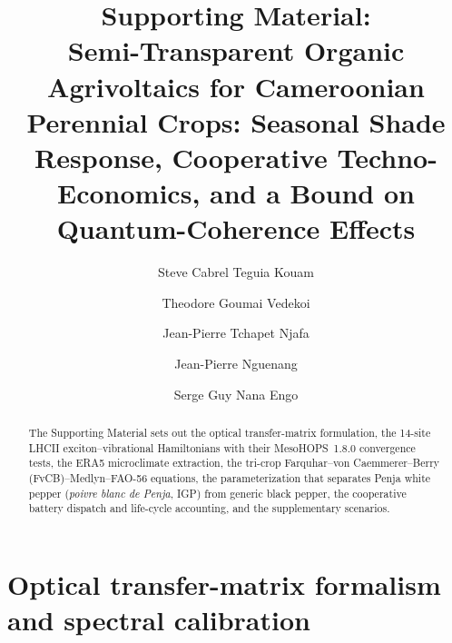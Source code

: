 \documentclass[preprint,12pt,a4paper]{elsarticle}
\begin{document}
\begin{frontmatter}
\title{Supporting Material:\\Semi-Transparent Organic Agrivoltaics for Cameroonian Perennial Crops: Seasonal Shade Response, Cooperative Techno-Economics, and a Bound on Quantum-Coherence Effects}

\author[udla]{Steve Cabrel Teguia Kouam}
\author[uy1]{Theodore Goumai Vedekoi}
\author[uy1]{Jean-Pierre Tchapet Njafa}
\author[udla]{Jean-Pierre Nguenang}
\author[uy1]{Serge Guy Nana Engo}

\address[udla]{Department of Physics, Faculty of Science, University of Douala, P.O. Box 24157, Douala, Cameroon}
\address[uy1]{Department of Physics, Faculty of Science, University of Yaound\'e~I, P.O. Box 812, Yaound\'e, Cameroon}

\begin{abstract}
The Supporting Material sets out the optical transfer-matrix formulation, the 14-site LHCII exciton--vibrational Hamiltonians with their MesoHOPS~1.8.0 convergence tests, the ERA5 microclimate extraction, the tri-crop Farquhar--von Caemmerer--Berry (FvCB)--Medlyn--FAO-56 equations, the parameterization that separates Penja white pepper (\textit{poivre blanc de Penja}, IGP) from generic black pepper, the cooperative battery dispatch and life-cycle accounting, and the supplementary scenarios.
\end{abstract}
\end{frontmatter}

\section{Optical transfer-matrix formalism and spectral calibration}
\label{sec:sm_tmm}
\end{document}
